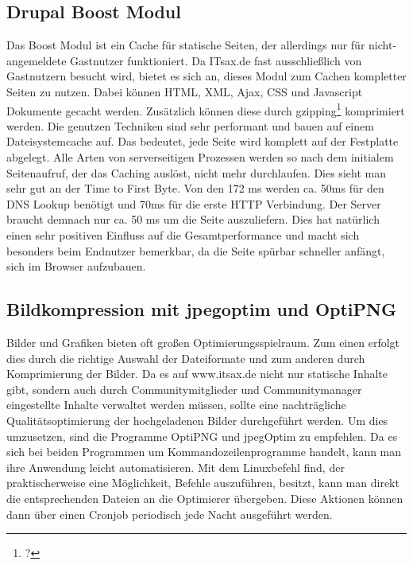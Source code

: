 \subsection{Drupal Boost Modul} Das Boost Modul ist ein Cache für statische Seiten, der allerdings nur für nicht-angemeldete Gastnutzer funktioniert. Da ITsax.de fast ausschließlich von Gastnutzern besucht wird, bietet es sich an, dieses Modul zum Cachen kompletter Seiten zu nutzen. Dabei k\"onnen HTML, XML, Ajax, CSS und Javascript Dokumente gecacht werden. Zus\"atzlich k\"onnen diese durch gzipping\footnote{?} komprimiert werden.
Die genutzen Techniken sind sehr performant und bauen auf einem Dateisystemcache auf. Das bedeutet, jede Seite wird komplett auf der Festplatte abgelegt. Alle Arten von serverseitigen Prozessen werden so nach dem initialem Seitenaufruf, der das Caching auslöst, nicht mehr durchlaufen. Dies sieht man sehr gut an der Time to First Byte. Von den 172 ms werden ca. 50ms für den DNS Lookup benötigt und 70ms für die erste HTTP Verbindung. Der Server braucht demnach nur ca. 50 ms um die Seite auszuliefern. Dies hat natürlich einen sehr positiven Einfluss auf die Gesamtperformance und macht sich besonders beim Endnutzer bemerkbar, da die Seite spürbar schneller anfängt, sich im Browser aufzubauen. 

\subsection{Bildkompression mit jpegoptim und OptiPNG}
Bilder und Grafiken bieten oft großen Optimierungsspielraum. Zum einen erfolgt dies durch die richtige Auswahl der Dateiformate und zum anderen durch Komprimierung der Bilder. Da es auf www.itsax.de nicht nur statische Inhalte gibt, sondern auch durch Communitymitglieder und Communitymanager eingestellte Inhalte verwaltet werden müssen, sollte eine nachträgliche Qualitätsoptimierung der hochgeladenen Bilder durchgeführt werden. Um dies umzusetzen, sind die Programme OptiPNG und jpegOptim zu empfehlen. Da es sich bei beiden Programmen um Kommandozeilenprogramme handelt, kann man ihre Anwendung leicht automatisieren. Mit dem Linuxbefehl find, der praktischerweise eine Möglichkeit, Befehle auszuführen, besitzt, kann man direkt die entsprechenden Dateien an die Optimierer übergeben. Diese Aktionen können dann über einen Cronjob periodisch jede Nacht ausgeführt werden. 

